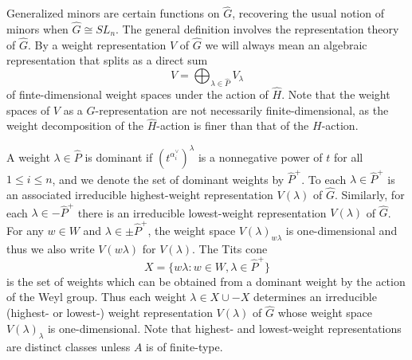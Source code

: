 \documentclass[12pt]{amsart}
\newcommand{\kk}{\Bbbk}%
\newcommand\onto{\twoheadrightarrow}
\newcommand\into{\hookrightarrow}
\DeclareMathOperator{\Hom}{Hom}
\DeclareMathOperator{\corank}{corank}
\theoremstyle{remark}
\numberwithin{equation}{section}
\begin{document}
Generalized minors are certain functions on $\widehat{G}$, recovering the usual notion of minors when $\widehat{G} \cong SL_n$. 
The general definition involves the representation theory of $\widehat{G}$. %
By a weight representation $V$ of $\widehat{G}$ we will always mean an algebraic representation that splits as a direct sum
\[
V = \bigoplus_{\lambda \in \widehat{P}} V_\lambda
\]
of finte-dimensional weight spaces under the action of $\widehat{H}$. Note that the weight spaces of $V$ as a $G$-representation are not necessarily finite-dimensional, as the weight decomposition of the $\widehat{H}$-action is finer than that of the $H$-action. 



A weight $\lambda \in \widehat{P}$ is dominant if $(t^{\alpha_i^\vee})^\lambda$ is a nonnegative power of $t$ for all $1 \leq i \leq n$, and we denote the set of dominant weights by $\widehat{P}^+$. 
To each $\lambda \in \widehat{P}^+$ is an associated irreducible highest-weight representation $V(\lambda)$ of $\widehat{G}$. 
Similarly, for each $\lambda \in -\widehat{P}^+$ there is an irreducible lowest-weight representation $V(\lambda)$ of $\widehat{G}$.
For any $w\in W$ and $\lambda\in\pm\widehat{P}^+$, the weight space $V(\lambda)_{w\lambda}$ is one-dimensional and thus we also write $V(w\lambda)$ for $V(\lambda)$.  
The Tits cone $$X = \{w\lambda : w \in W, \lambda \in \widehat{P}^+\}$$ is the set of weights which can be obtained from a dominant weight by the action of the Weyl group. 
Thus each weight $\lambda\in X \cup -X$ determines an irreducible (highest- or lowest-) weight representation $V(\lambda)$ of $\widehat{G}$ whose weight space $V(\lambda)_\lambda$ is one-dimensional.
Note that highest- and lowest-weight representations are distinct classes unless $A$ is of finite-type.
\end{document}
